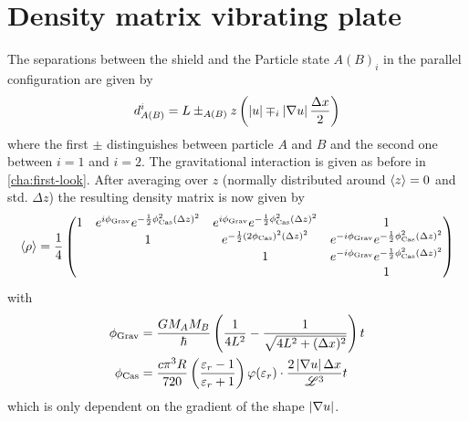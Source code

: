 \section{Density matrix vibrating plate} \label{apx:density-matrix-vibrating-plate}
The separations between the shield and the Particle state $A(B)_i$ in the parallel configuration are given by
\begin{equation}
  d^i_{A(B)} = L \pm_{A(B)} z \left(\left\lvert u\right\rvert \mp_i \left\lvert\nabla u\right\rvert \frac{\Delta x}{2}\right)
\end{equation}
where the first $\pm$ distinguishes between particle $A$ and $B$ and the second one between $i=1$ and $i=2$. The gravitational interaction is given as before in \cref{cha:first-look}.
After averaging over $z$ (normally distributed around $\left\langle z\right\rangle = 0$ and std. $\Delta z$) the resulting density matrix is now given by
\begin{equation}
  \left\langle\rho\right\rangle = \frac{1}{4} \begin{pmatrix}
    1 & e^{i \phi_\mathrm{Grav}} e^{- \frac{1}{2} \phi_\mathrm{Cas}^2 (\Delta z)^2} & e^{i \phi_\mathrm{Grav}} e^{- \frac{1}{2} \phi_\mathrm{Cas}^2 (\Delta z)^2} & 1 \\
    & 1 & e^{- \frac{1}{2} (2 \phi_\mathrm{Cas})^2 (\Delta z)^2} & e^{-i \phi_\mathrm{Grav}} e^{- \frac{1}{2} \phi_\mathrm{Cas}^2(\Delta z)^2} \\
    & & 1 & e^{-i \phi_\mathrm{Grav}} e^{- \frac{1}{2} \phi_\mathrm{Cas}^2 (\Delta z)^2} \\
    & & & 1
  \end{pmatrix}
\end{equation}
with
\begin{align}
  \phi_\mathrm{Grav} &= \frac{G M_A M_B}{\hbar} \left(\frac{1}{4L^2} - \frac{1}{\sqrt{4L^2 + (\Delta x)^2}}\right) t \\
  \phi_\mathrm{Cas} &= \frac{c \pi^3 R}{720} \left(\frac{\varepsilon_r - 1}{\varepsilon_r + 1}\right)\varphi(\varepsilon_r)\cdot \frac{2 \left\lvert\nabla u\right\rvert \Delta x}{\mathscr{L}^3} t
\end{align}
which is only dependent on the gradient of the shape $\left\lvert\nabla u\right\rvert$.